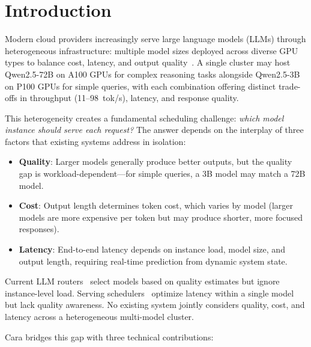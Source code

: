 \documentclass[letterpaper, anonymous, twocolumn, 10pt]{article}
\begin{document}
\section{Introduction} \label{section:introduction}

Modern cloud providers increasingly serve large language models (LLMs) through heterogeneous infrastructure: multiple model sizes deployed across diverse GPU types to balance cost, latency, and output quality~\cite{openaiIntroducingGPT5, microsoftModelRouter}.
A single cluster may host Qwen2.5-72B on A100 GPUs for complex reasoning tasks alongside Qwen2.5-3B on P100 GPUs for simple queries, with each combination offering distinct trade-offs in throughput (11--98~tok/s), latency, and response quality.

This heterogeneity creates a fundamental scheduling challenge: \emph{which model instance should serve each request?}
The answer depends on the interplay of three factors that existing systems address in isolation:
\begin{itemize}
    \item \textbf{Quality}: Larger models generally produce better outputs, but the quality gap is workload-dependent---for simple queries, a 3B model may match a 72B model.
    \item \textbf{Cost}: Output length determines token cost, which varies by model (larger models are more expensive per token but may produce shorter, more focused responses).
    \item \textbf{Latency}: End-to-end latency depends on instance load, model size, and output length, requiring real-time prediction from dynamic system state.
\end{itemize}

Current LLM routers~\cite{Ong2024RouteLLMLT, universal_model_routering} select models based on quality estimates but ignore instance-level load.
Serving schedulers~\cite{da2025blockbalancingloadllm, zhong2024distservedisaggregatingprefilldecoding} optimize latency within a single model but lack quality awareness.
No existing system jointly considers quality, cost, and latency across a heterogeneous multi-model cluster.

Cara bridges this gap with three technical contributions:
\end{document}
